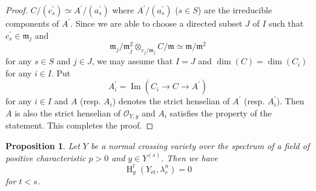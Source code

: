 \documentclass{article}
\newtheorem{prop}[thm]{\indent \sc Proposition}
\newcommand{\et}{\mathrm{\acute{e}t}}
\newcommand{\HO}{\operatorname{H}}
\begin{document}
\begin{proof}
\begin{math}
C/(c^{\prime}_{s})
\simeq    
A^{\prime}/(a^{\prime}_{s})
\end{math}
%
where
$A^{\prime}/(a^{\prime}_{s})$ ($s\in S$) are the irreducible components 
of $A^{\prime}$.
Since we are able to choose a directed subset
$J$ of $I$ such that $c_{s}^{\prime}\in \mathfrak{m}_{j}$ and
%
\begin{equation*}
\mathfrak{m}_{j}/\mathfrak{m}_{j}^{2}
\otimes_{c_{j}/\mathfrak{m}_{j}}C/\mathfrak{m}
\simeq 
\mathfrak{m}/\mathfrak{m}^{2}
\end{equation*}
%
for any $s\in S$ and $j\in J$, we may assume that $I=J$
and
%
\begin{math}
\operatorname{dim}(C)
=
\operatorname{dim}(C_{i})
\end{math}
%
for any $i\in I$.
Put
%
\begin{equation*}
A_{i}^{\prime}
=
\operatorname{Im}\left(
C_{i}\to
C\to
A^{\prime}
\right)
\end{equation*}
%
for any $i\in I$ and $A$ (resp. $A_{i}$) denotes the strict henselian of $A^{\prime}$ (resp. $A^{\prime}_{i}$). 
Then 
$A$ is also the strict henselian of $\mathcal{O}_{Y, y}$
and
$A_{i}$ satisfies the property of the statement.
This completes the proof.
\end{proof}
%

%
%
\begin{prop}\upshape\label{hvan}
Let $Y$ be a normal crossing variety over 
the spectrum of
a field 
of positive characteristic $p>0$ and $y\in Y^{(s)}$.
Then we have
%
\begin{equation*}
\HO_{y}^{t}(Y_{\et}, \lambda_{r}^{n})=0    
\end{equation*}
%
for $t<s$.
\end{prop}
%
\end{document}
